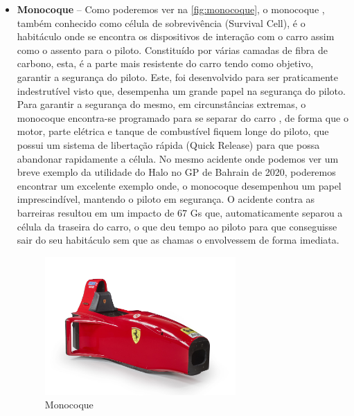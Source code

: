 \documentclass{report}
\begin{document}
\begin{itemize}
\item \textbf{Monocoque} – Como poderemos ver na \autoref{fig:monocoque}, o monocoque \cite{monocoque}, também conhecido como célula de sobrevivência (Survival Cell), é o habitáculo onde se encontra os dispositivos de interação com o carro assim como o assento para o piloto. Constituído por várias camadas de fibra de carbono, esta, é a parte mais resistente do carro tendo como objetivo, garantir a segurança do piloto. Este, foi desenvolvido para ser praticamente indestrutível visto que, desempenha um grande papel na segurança do piloto.
Para garantir a segurança do mesmo, em circunstâncias extremas, o monocoque encontra-se programado para se separar do carro \cite{separacaomonocoque}, de forma que o motor, parte elétrica e tanque de combustível fiquem longe do piloto, que possui um sistema de libertação rápida (Quick Release) para que possa abandonar rapidamente a célula.
No mesmo acidente onde podemos ver um breve exemplo da utilidade do Halo no GP de Bahrain de 2020, poderemos encontrar um excelente exemplo onde, o monocoque desempenhou um papel imprescindível, mantendo o piloto em segurança. 
O acidente contra as barreiras resultou em um impacto de 67 Gs que, automaticamente separou a célula da traseira do carro, o que deu tempo ao piloto para que conseguisse sair do seu habitáculo sem que as chamas o envolvessem de forma imediata.\\[4cm]
\begin{figure}[h]
\center %
\includegraphics[height=150pt]{monocoque}
\caption{Monocoque}
\label{fig:monocoque}
\end{figure}



\end{itemize}
\end{document}
